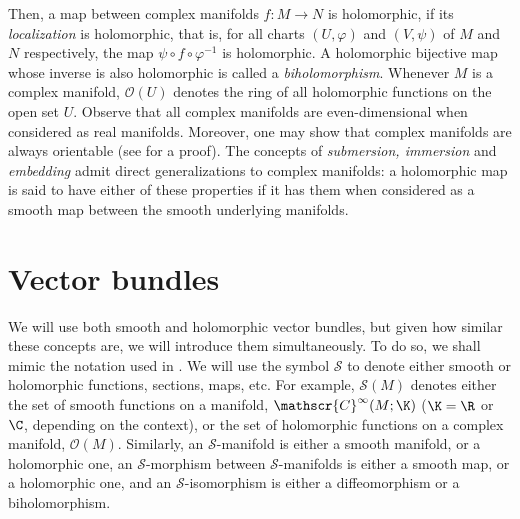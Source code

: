 Then, a map between complex manifolds \(f\colon M \to N\) is holomorphic, if its \textit{localization} is holomorphic, that is, for all charts \((U, \varphi)\) and \((V, \psi)\) of \(M\) and \(N\) respectively, the map \(\psi \circ f \circ \varphi^{-1}\) is holomorphic. A holomorphic bijective map whose inverse is also holomorphic is called a \textit{biholomorphism}. Whenever \(M\) is a complex manifold, \(\mathcal{O}(U)\) denotes the ring of all holomorphic functions on the open set \(U\). Observe that all complex manifolds are even-dimensional when considered as real manifolds. Moreover, one may show that complex manifolds are always orientable (see \parencite[Prop. 1.49]{lee_introCM} for a proof). The concepts of \textit{submersion, immersion} and \textit{embedding} admit direct generalizations to complex manifolds: a holomorphic map is said to have either of these properties if it has them when considered as a smooth map between the smooth underlying manifolds.

\section{Vector bundles}
We will use both smooth and holomorphic vector bundles, but given how similar these concepts are, we will introduce them simultaneously. To do so, we shall mimic the notation used in \parencite{garcia2007differential}. We will use the symbol \(\mathcal{S}\) to denote either smooth or holomorphic functions, sections, maps, etc. For example, \(\mathcal{S}(M)\) denotes either the set of smooth functions on a manifold, \(\mathscr{C}^\infty(M;\K)\) (\(\K=\R\) or \(\C\), depending on the context), or the set of holomorphic functions on a complex manifold, \(\mathcal{O}(M)\). Similarly, an \(\mathcal{S}\)-manifold is either a smooth manifold, or a holomorphic one, an \(\mathcal{S}\)-morphism between \(\mathcal{S}\)-manifolds is either a smooth map, or a holomorphic one, and an \(\mathcal{S}\)-isomorphism is either a diffeomorphism or a biholomorphism.

